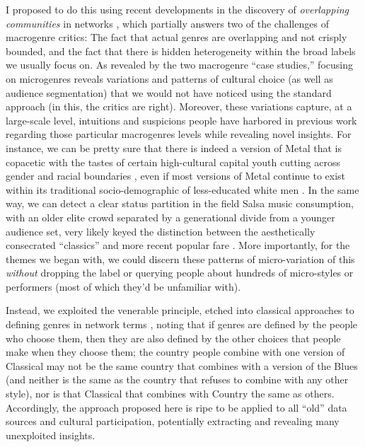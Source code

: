 \documentclass[a4paper,12pt]{extarticle}
\begin{document}
I proposed to do this using recent developments in the discovery of \textit{overlapping communities} in networks \citep{ahn_etal10}, which partially answers two of the challenges of macrogenre critics: The fact that actual genres are overlapping and not crisply bounded, and the fact that there is hidden heterogeneity within the broad labels we usually focus on. As revealed by the two macrogenre ``case studies,'' focusing on microgenres reveals variations and patterns of cultural choice (as well as audience segmentation) that we would not have noticed using the standard approach (in this, the critics are right). Moreover, these variations capture, at a large-scale level, intuitions and suspicions people have harbored in previous work regarding those particular macrogenres levels while revealing novel insights. For instance, we can be pretty sure that there is indeed a version of Metal that is copacetic with the tastes of certain high-cultural capital youth cutting across gender and racial boundaries \citep{tampubolon2008revisiting}, even if most versions of Metal continue to exist within its traditional socio-demographic of less-educated white men \citep{bryson96}. In the same way, we can detect a clear status partition in the field Salsa music consumption, with an older elite crowd separated by a generational divide from a younger audience set, very likely keyed the distinction between the aesthetically consecrated ``classics'' and more recent popular fare \citep{Bachmayer2014-pk}. More importantly, for the themes we began with, we could discern these patterns of micro-variation of this \textit{without} dropping the label or querying people about hundreds of micro-styles or performers (most of which they'd be unfamiliar with). 

Instead, we exploited the venerable principle, etched into classical approaches to defining genres in network terms \citep{dimaggio1987classification}, noting that if genres are defined by the people who choose them, then they are also defined by the other choices that people make when they choose them; the country people combine with one version of Classical may not be the same country that combines with a version of the Blues (and neither is the same as the country that refuses to combine with any other style), nor is that Classical that combines with Country the same as others. Accordingly, the approach proposed here is ripe to be applied to all ``old'' data sources and cultural participation, potentially extracting and revealing many unexploited insights. 
\end{document}
